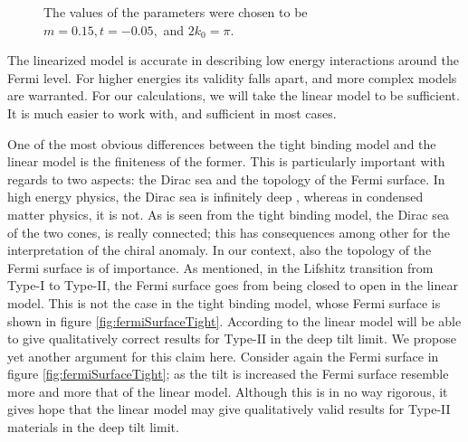 \begin{figure}[ht]
  \caption{The values of the parameters were chosen to be \(m=0.15, t=-0.05, \) and \(2 k_{0}=\pi\).\label{fig:ridgeline2}}
\end{figure}


The linearized model is accurate in describing low energy interactions around the Fermi level.
For higher energies its validity falls apart, and more complex models are warranted.
For our calculations, we will take the linear model to be sufficient.
It is much easier to work with, and sufficient in most cases.

\label{sec:tilt:fermisurface-paragraph}
One of the most obvious differences between the tight binding model and the linear model is the finiteness of the former.
This is particularly important with regards to two aspects: the Dirac sea and the topology of the Fermi surface.
In high energy physics, the Dirac sea is infinitely deep \cites{burkovTopologicalSemimetals2016,vozmedianoTheoreticalPhysicsColloquium2021}, whereas in condensed matter physics, it is not.
As is seen from the tight binding model, the Dirac sea of the two cones, is really connected;
this has consequences among other for the interpretation of the chiral anomaly.
In our context, also the topology of the Fermi surface is of importance.
As mentioned, in the Lifshitz transition from Type-I to Type-II, the Fermi surface goes from being closed to open in the linear model.
This is not the case in the tight binding model, whose Fermi surface is shown in figure \ref{fig:fermiSurfaceTight}.
According to \textcite{ferreirosAnomalousNernstThermal2017} the linear model will be able to give qualitatively correct results for Type-II in the deep tilt limit.
We propose yet another argument for this claim here.
Consider again the Fermi surface in figure \ref{fig:fermiSurfaceTight};
as the tilt is increased the Fermi surface resemble more and more that of the linear model.
Although this is in no way rigorous, it gives hope that the linear model may give qualitatively valid results for Type-II materials in the deep tilt limit.

